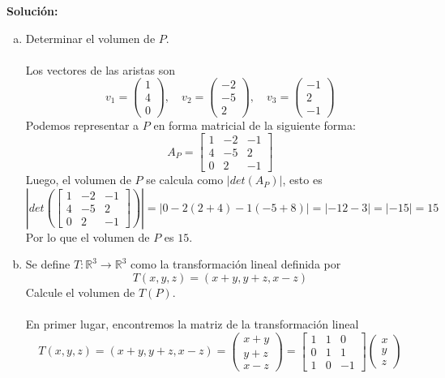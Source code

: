 \documentclass[12pt]{article}
\newenvironment{solucion}
{\begin{mdframed}[backgroundcolor=black!10]
		{\bf Solución:}\\
	}
	{
	\end{mdframed}
}
\newenvironment{preguntas}
{\begin{enumerate}\itemsep12pt
	}
	{
	\end{enumerate}
}
\newcommand{\ra}{\rightarrow}
\newcommand{\R}{\mathbb{R}}
\begin{document}
\begin{preguntas}
\begin{solucion}
\begin{enumerate}[a)]
\item Determinar el volumen de $P$.\\
			\\
			Los vectores de las aristas son 
			$$v_1 = \begin{pmatrix}
			1 \\ 4 \\ 0
			\end{pmatrix}, \quad
			v_2 = \begin{pmatrix}
			-2 \\ -5 \\ 2
			\end{pmatrix}, \quad
			v_3 = \begin{pmatrix}
			-1 \\ 2 \\ -1
			\end{pmatrix}$$
			Podemos representar a $P$ en forma matricial de la siguiente forma:
			$$A_P = \begin{bmatrix}
			1 & -2 & -1 \\
			4 & -5 & 2 \\
			0 & 2 & -1
			\end{bmatrix}$$
			Luego, el volumen de $P$ se calcula como $|det(A_P)|$, esto es
			$$\left| det \left(\begin{bmatrix}
			1 & -2 & -1 \\
			4 & -5 & 2 \\
			0 & 2 & -1
			\end{bmatrix}\right)\right| =| 0 -2(2+4) - 1(-5+8)| = |-12 - 3| =| -15| = 15$$
			Por lo que el volumen de $P$ es $15$.
\item Se define $T: \R^3 \ra \R^3$ como la transformación lineal definida por $$T(x,y,z)=(x+y,y+z,x-z)$$
			Calcule el volumen de $T(P)$.\\
			\\
			En primer lugar, encontremos la matriz de la transformación lineal
			$$T(x,y,z)=(x+y,y+z,x-z) = \begin{pmatrix}
			x+y \\ 
			y+z \\ 
			x-z
			\end{pmatrix} = \begin{bmatrix}
			1 & 1 & 0 \\
			0 & 1 & 1 \\
			1 & 0 & -1 
			\end{bmatrix} \begin{pmatrix}
			x \\ y \\ z

\end{pmatrix}$$
\end{enumerate}
\end{solucion}
\end{preguntas}
\end{document}
